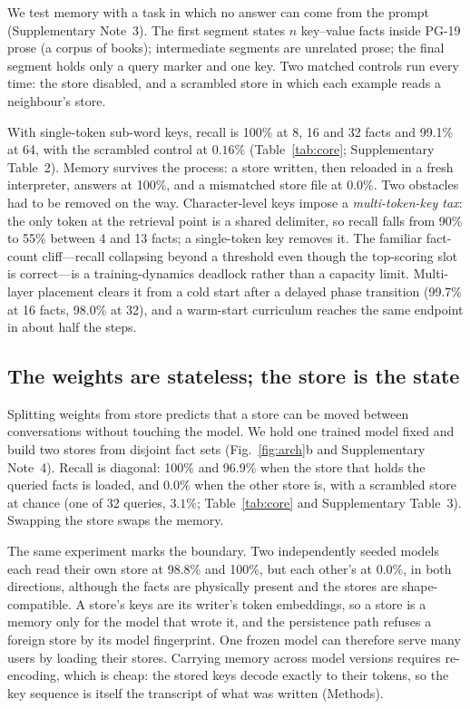 We test memory with a task in which no answer can come from the prompt (Supplementary Note~3). The first segment
states $n$ key--value facts inside PG-19 prose (a corpus of books)\cite{rae2020compressive}; intermediate
segments are unrelated prose; the final segment holds only a query marker and one key. Two
matched controls run every time: the store disabled, and a scrambled store in which each
example reads a neighbour's store.

With single-token sub-word keys\cite{sennrich2016bpe}, recall is 100\% at 8, 16 and 32
facts and 99.1\% at 64, with the scrambled control at $0.16\%$ (Table~\ref{tab:core}; Supplementary Table~2).
Memory survives the process: a store written, then reloaded in a fresh interpreter, answers
at 100\%, and a mismatched store file at $0.0\%$. Two obstacles had to be removed on
the way. Character-level keys impose a \emph{multi-token-key tax}: the only token at the
retrieval point is a shared delimiter, so recall falls from
90\% to 55\% between 4 and 13 facts; a single-token key removes it. The
familiar fact-count cliff---recall collapsing beyond a threshold even though the top-scoring
slot is correct---is a training-dynamics deadlock rather than a capacity limit. Multi-layer
placement clears it from a cold start after a delayed phase transition (99.7\% at 16
facts, 98.0\% at 32), and a warm-start curriculum reaches the same endpoint in about
half the steps.

\subsection*{The weights are stateless; the store is the state}

Splitting weights from store predicts that a store can be moved between conversations
without touching the model. We hold one trained model fixed and build two stores from
disjoint fact sets (Fig.~\ref{fig:arch}b and Supplementary Note~4). Recall
is diagonal: 100\% and 96.9\% when the store that holds the queried facts is
loaded, and $0.0\%$ when the other store is, with a scrambled store at chance (one of 32 queries, $3.1\%$; Table~\ref{tab:core} and Supplementary Table~3). Swapping the store swaps the memory.

The same experiment marks the boundary. Two independently seeded models each read their own
store at 98.8\% and 100\%, but each other's at $0.0\%$, in both directions,
although the facts are physically present and the stores are shape-compatible. A store's
keys are its writer's token embeddings, so a store is a memory only for the model that wrote
it, and the persistence path refuses a foreign store by its model fingerprint. One frozen
model can therefore serve many users by loading their stores. Carrying memory across model
versions requires re-encoding, which is cheap: the stored keys decode exactly to their
tokens, so the key sequence is itself the transcript of what was written (Methods).

